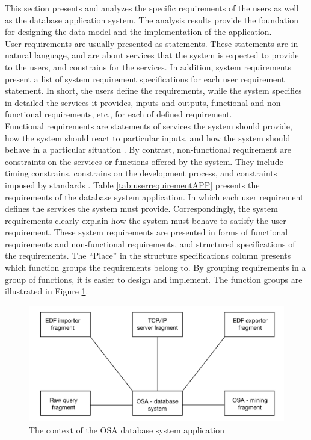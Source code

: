 This section presents and analyzes the specific requirements of the users as well as the database application system. The analysis results provide the foundation for designing the data model and the implementation of the application.\\
User requirements are usually presented as statements. These statements are in natural language, and are about services that the system is expected to provide to the users, and constrains for the services. In addition, system requirements present a list of system requirement specifications for each user requirement statement. In short, the users define the requirements, while the system specifies in detailed the services it provides, inputs and outputs, functional and non-functional requirements, etc., for each of defined requirement.\\
Functional requirements are statements of services the system should provide, how the system should react to particular inputs, and how the system should behave in a particular situation \citep{INF1050BOOK}. By contrast, non-functional requirement are constraints on the services or functions offered by the system. They include timing constrains, constrains on the development process, and constraints imposed by standards \citep{INF1050BOOK}.
Table \ref{tab:userrequirementAPP} presents the requirements of the database system application. In which each user requirement defines the services the system must provide. Correspondingly, the system requirements clearly explain how the system must behave to satisfy the user requirement. These system requirements are presented in forms of functional requirements and non-functional requirements, and structured specifications of the requirements. The “Place” in the structure specifications column presents which function groups the requirements belong to. By grouping requirements in a group of functions, it is easier to design and implement. The function groups are illustrated in Figure \ref{fig:Figures/OSADBSContext}.
\begin{figure}
    \centering
    \includegraphics[width=1.0\textwidth]{Figures/OSADBSContext.png}
    \caption{The context of the OSA database system application}
    \label{fig:Figures/OSADBSContext}
\end{figure}
